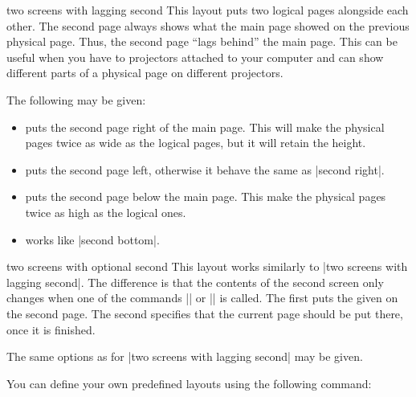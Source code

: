 \begin{pgflayout}{two screens with lagging second}
  This layout puts two logical pages alongside each other. The second
  page always shows what the main
  page showed on the previous physical page. Thus, the second page
  ``lags behind'' the main page. This can be useful when you have to
  projectors attached to your computer and can show different parts of
  a physical page on different projectors.

  The following  may be given:
  \begin{itemize}
  \item {} puts the second page right of the
    main page. This will make the physical pages twice as wide
    as the logical pages, but it will retain the height.
  \item {} puts the second page left,
    otherwise it behave the same as |second right|.
  \item {} puts the second page below the main
    page. This make the physical pages twice as high as the logical
    ones.
  \item {} works like |second bottom|.      
  \end{itemize}
\end{pgflayout}

\begin{pgflayout}{two screens with optional second}
  This layout works similarly to
  |two screens with lagging second|. The difference is that the
  contents of the second screen only changes when one of the commands
  || or
  || is called. The first puts the
  given  on the second page. The second specifies that the
  current page should be put there, once it is finished.

  The same options as for |two screens with lagging second| may be
  given. 
\end{pgflayout}



You can define your own predefined layouts using the following
command:

